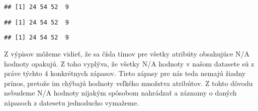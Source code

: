 \documentclass[
]{article}
\newenvironment{Shaded}{\begin{snugshade}}{\end{snugshade}}
\newcommand{\FunctionTok}[1]{\textcolor[rgb]{0.00,0.00,0.00}{#1}}
\newcommand{\NormalTok}[1]{#1}
\newcommand{\OtherTok}[1]{\textcolor[rgb]{0.56,0.35,0.01}{#1}}
\newcommand{\SpecialCharTok}[1]{\textcolor[rgb]{0.00,0.00,0.00}{#1}}
\begin{document}
\begin{verbatim}
## [1] 24 54 52  9
\end{verbatim}

\begin{Shaded}
\end{Shaded}

\begin{verbatim}
## [1] 24 54 52  9
\end{verbatim}

\begin{Shaded}
\end{Shaded}

\begin{verbatim}
## [1] 24 54 52  9
\end{verbatim}

Z výpisov môžeme vidieť, že sa čísla tímov pre všetky atribúty
obsahujúce N/A hodnoty opakujú. Z toho vyplýva, že všetky N/A hodnoty v
našom datasete sú z práve týchto 4 konkrétnych zápasov. Tieto zápasy pre
nás teda nemajú žiadny prínos, pretože im chýbajú hodnoty veľkého
množstva atribútov. Z tohto dôvodu nebudeme N/A hodnoty nijakým spôsobom
nahrádzať a záznamy o daných zápasoch z datesetu jednoducho vymažeme.

\begin{Shaded}
\end{Shaded}
\end{document}
